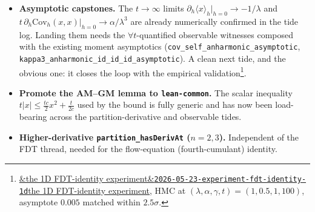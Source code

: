 \documentclass[11pt]{article}
\newcommand{\experimentref}[2][]{\href{https://therisensea.org/experiments/#2/}{\ifx&#1&\texttt{#2}\else#1\fi}}
\begin{document}
\begin{itemize}[itemsep=3pt]
\item \textbf{Asymptotic capstones.} The $t\to\infty$ limits
  $\partial_h\langle x\rangle_h|_{h=0}\to -1/\lambda$ and
  $t\,\partial_h\mathrm{Cov}_h(x,x)|_{h=0}\to \alpha/\lambda^3$ are
  already numerically confirmed in the tide log. Landing them needs the
  $\forall t$-quantified observable witnesses composed with the existing
  moment asymptotics (\texttt{cov\_self\_anharmonic\_asymptotic},
  \texttt{kappa3\_anharmonic\_id\_id\_id\_asymptotic}). A clean next
  tide, and the obvious one: it closes the loop with the empirical
  validation\footnote{\experimentref[the 1D FDT-identity experiment]{2026-05-23-experiment-fdt-identity-1d}, HMC at $(\lambda,\alpha,\gamma,t)=(1,0.5,1,100)$, asymptote $0.005$ matched within $2.5\sigma$.}.
\item \textbf{Promote the AM--GM lemma to \texttt{lean-common}.} The
  scalar inequality $t|x| \le \tfrac{tc}{2}x^2 + \tfrac{t}{2c}$ used by
  the bound is fully generic and has now been load-bearing across the
  partition-derivative and observable tides.
\item \textbf{Higher-derivative \texttt{partition\_hasDerivAt} ($n=2,3$).}
  Independent of the FDT thread, needed for the flow-equation
  (fourth-cumulant) identity.
\end{itemize}
\end{document}
